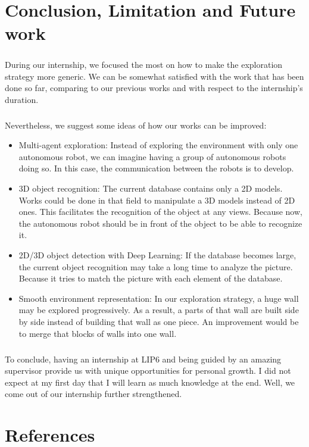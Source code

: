 \documentclass[12pt]{report}
\begin{document}
	\chapter{Conclusion, Limitation and Future work}
	\paragraph{}
	During our internship, we focused the most on how to make the exploration strategy more generic. We can be somewhat satisfied with the work that has been done so far, comparing to our previous works and with respect to the internship's duration.

	\paragraph{}
	Nevertheless, we suggest some ideas of how our works can be improved:
	\begin{itemize}
		\item Multi-agent exploration: Instead of exploring the environment with only one autonomous robot, we can imagine having a group of autonomous robots doing so. In this case, the communication between the robots is to develop.
		\item 3D object recognition: The current database contains only a 2D models. Works could be done in that field to manipulate a 3D models instead of 2D ones. This facilitates the recognition of the object at any views. Because now, the autonomous robot should be in front of the object to be able to recognize it.
		\item 2D/3D object detection with Deep Learning: If the database becomes large, the current object recognition may take a long time to analyze the picture. Because it tries to match the picture with each element of the database.
		\item Smooth environment representation: In our exploration strategy, a huge wall may be explored progressively. As a result, a parts of that wall are built side by side instead of building that wall as one piece. An improvement would be to merge that blocks of walls into one wall.
		
	\end{itemize}
\paragraph{}
To conclude, having an internship at LIP6 and being guided by an amazing supervisor provide us with unique opportunities for personal growth. I did not expect at my first day that I will learn as much knowledge at the end. Well, we come out of our internship further strengthened. 
	\chapter{References}
 
\end{document}
